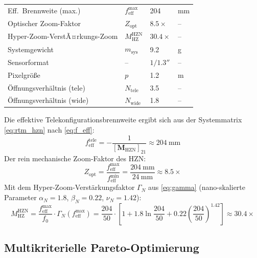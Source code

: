 ﻿\documentclass[12pt,a4paper]{article}
\theoremstyle{definition}
\newcommand{\HZ}{\mathrm{HZ}}
\newcommand{\eff}{\mathrm{eff}}
\begin{document}
\begin{table}[H]
\begin{tabular}{llll}
			\rowcolor{blue!8}
			Eff.\ Brennweite (max.)       & $f_\eff^\mathrm{max}$ & 204& mm \\
			Optischer Zoom-Faktor         & $Z_\mathrm{opt}$ & $8.5\times$ & -- \\
			\rowcolor{blue!8}
			Hyper-Zoom-VerstÃ¤rkungs-Zoom   & $M_\HZ^\mathrm{HZN}$& $30.4\times$ & -- \\
			Systemgewicht                 & $m_\mathrm{sys}$ & 9.2    & g \\
			\rowcolor{blue!8}
			Sensorformat                  & --               & $1/1.3''$& -- \\
			Pixelgr\"o{\ss}e             & $p$              & 1.2    & \textmu m \\
			\rowcolor{blue!8}
			\"Offnungsverh\"altnis (tele) & $N_\mathrm{tele}$& 3.5    & -- \\
			\"Offnungsverh\"altnis (wide) & $N_\mathrm{wide}$& 1.8    & -- \\
			\bottomrule
		\end{tabular}
	\end{table}

	Die effektive Telekonfigurationsbrennweite ergibt sich aus der Systemmatrix
	\eqref{eq:rtm_hzn} nach \eqref{eq:f_eff}:
	\begin{equation}
		f_\eff^\mathrm{tele}
		= -\frac{1}{[\mathbf{M}_\mathrm{HZN}]_{21}}
		\approx \SI{204}{\milli\metre}
		\label{eq:feff_hzn_tele}
	\end{equation}
	Der rein mechanische Zoom-Faktor des HZN:
	\begin{equation}
		Z_\mathrm{opt}
		= \frac{f_\eff^\mathrm{max}}{f_\eff^\mathrm{min}}
		= \frac{\SI{204}{\milli\metre}}{\SI{24}{\milli\metre}}
		\approx 8.5\times
		\label{eq:zoom_ratio_hzn}
	\end{equation}
	Mit dem Hyper-Zoom-Verst\"arkungsfaktor $\Gamma_N$ aus \eqref{eq:gamma}
	(nano-skalierte Parameter $\alpha_N = 1.8$, $\beta_N = 0.22$,
	$\nu_N = 1.42$):
	\begin{equation}
		\boxed{
			M_\HZ^\mathrm{HZN}
			= \frac{f_\eff^\mathrm{max}}{f_0}\cdot
			\Gamma_N\!\left(f_\eff^\mathrm{max}\right)
			= \frac{204}{50}\cdot\!\left[1
			+ 1.8\ln\!\frac{204}{50}
			+ 0.22\!\left(\frac{204}{50}\right)^{\!1.42}\right]
			\approx 30.4\times
		}
		\label{eq:Mhz_hzn}
	\end{equation}

	\subsection{Multikriterielle Pareto-Optimierung}
\end{document}
